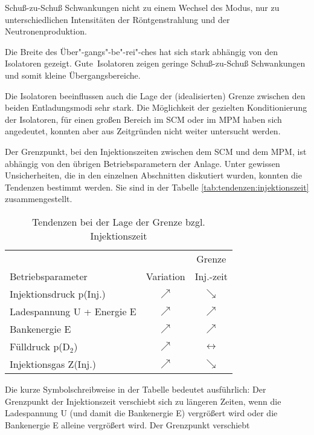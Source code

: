 Schuß-zu-Schuß Schwankungen nicht zu einem Wechsel des Modus, nur
zu unterschiedlichen Intensitäten der Röntgenstrahlung und der
Neutronenproduktion.
\par
Die Breite des Über"-gangs"-be"-rei"-ches hat sich stark abhängig
von den Isolatoren gezeigt. \glqq Gute\grqq\ Isolatoren zeigen
geringe Schuß-zu-Schuß Schwankungen und somit kleine
Übergangsbereiche.
\par
Die Isolatoren beeinflussen auch die Lage der (idealisierten) Grenze
zwischen den beiden Entladungsmodi sehr stark. Die Möglichkeit der
gezielten Konditionierung der Isolatoren, für einen großen Bereich im
SCM oder im MPM haben sich angedeutet, konnten aber aus Zeitgründen
nicht weiter untersucht werden.
\par
Der Grenzpunkt, bei den Injektionszeiten zwischen dem SCM und dem MPM,
ist abhängig von den übrigen Betriebsparametern der Anlage. Unter
gewissen Unsicherheiten, die in den einzelnen Abschnitten diskutiert
wurden, konnten die Tendenzen bestimmt werden. Sie sind in der Tabelle
\vref{tab:tendenzen:injektionszeit} zusammengestellt.
%
\par
\begin{table}[H]
  \center
  \begin{tabular}{|l|c|c|}
      \hline
                                &            & Grenze           \\
    Betriebsparameter           & Variation  & Inj.-zeit         \\
      \hline
    Injektionsdruck p(Inj.)     & $\nearrow$ & $\searrow$        \\
    Ladespannung U + Energie E  & $\nearrow$ & $\nearrow$        \\
    Bankenergie E               & $\nearrow$ & $\nearrow$        \\
    Fülldruck p(D$_2$)          & $\nearrow$ & $\leftrightarrow$ \\
    Injektionsgas Z(Inj.)    & $\nearrow$ & $\searrow$        \\
      \hline
  \end{tabular}
  \caption{Tendenzen bei der Lage der Grenze bzgl. Injektionszeit}
  \label{tab:tendenzen:injektionszeit}
\end{table}
%
\par
Die kurze Symbolschreibweise in der Tabelle bedeutet ausführlich: Der
Grenzpunkt der Injektionszeit verschiebt sich zu längeren Zeiten, wenn
die Ladespannung U (und damit die Bankenergie E) vergrößert wird oder
die Bankenergie E alleine vergrößert wird. Der Grenzpunkt verschiebt
